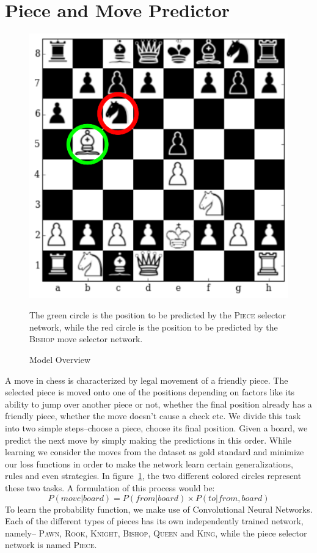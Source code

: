 \section{Piece and Move Predictor}
\label{section:network-arch}
\begin{figure}[h]
\centering
\includegraphics[scale=0.75]{img/from_to.png}
\caption{Model Overview}
\label{figure:model_overview}
\justifying
\small The green circle is the position to be predicted by the \textsc{Piece} 
selector network, while the red circle is the position to be predicted by the 
\textsc{Bishop} move selector network.
\end{figure}
A move in chess is characterized by legal movement of a friendly piece. The 
selected piece is moved onto one of the positions depending on factors like its 
ability to jump over another piece or not, whether the final position already 
has a friendly piece, whether the move doesn't cause a check etc. We divide 
this task into two simple steps--choose a piece, choose its final position. 
Given a board, we predict the next move by simply making the 
predictions in this order. While learning we consider the moves from the 
dataset as gold standard and minimize our loss functions in order to make the 
network learn certain generalizations, rules and even strategies. In 
figure~\ref{figure:model_overview}, the two different colored circles represent 
these two tasks. A formulation of this process would be:
\[P(move | board) = P(from|board)\times P(to|from, board)\]
To learn the probability function, we make use of Convolutional Neural 
Networks. Each of the different types of pieces has its own independently 
trained network, namely-- \textsc{Pawn}, \textsc{Rook}, \textsc{Knight}, 
\textsc{Bishop}, \textsc{Queen} and \textsc{King}, while the piece selector 
network is named \textsc{Piece}.\\


